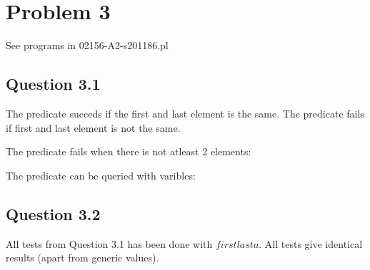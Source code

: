\newpage
\section*{Problem 3}
See programs in 02156-A2-s201186.pl

\subsection*{Question 3.1}
The predicate succeds if the first and last element is the same.
The predicate fails if first and last element is not the same.

The predicate fails when there is not atleast 2 elements:

The predicate can be queried with varibles:

\subsection*{Question 3.2}
All tests from Question 3.1 has been done with $firstlasta$. All tests give identical results (apart from generic values).